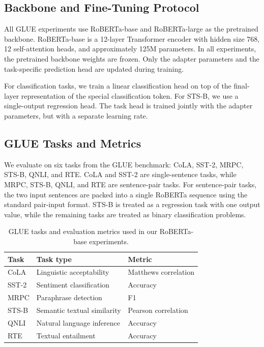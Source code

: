 \subsection{Backbone and Fine-Tuning Protocol}

All GLUE experiments use RoBERTa-base and RoBERTa-large as the pretrained backbone. RoBERTa-base is a 12-layer Transformer encoder with hidden size 768, 12 self-attention heads, and approximately 125M parameters. In all experiments, the pretrained backbone weights are frozen. Only the adapter parameters and the task-specific prediction head are updated during training.

For classification tasks, we train a linear classification head on top of the final-layer representation of the special classification token. For STS-B, we use a single-output regression head. The task head is trained jointly with the adapter parameters, but with a separate learning rate.

\subsection{GLUE Tasks and Metrics}

We evaluate on six tasks from the GLUE benchmark: CoLA, SST-2, MRPC, STS-B, QNLI, and RTE. CoLA and SST-2 are single-sentence tasks, while MRPC, STS-B, QNLI, and RTE are sentence-pair tasks. For sentence-pair tasks, the two input sentences are packed into a single RoBERTa sequence using the standard pair-input format. STS-B is treated as a regression task with one output value, while the remaining tasks are treated as binary classification problems.

\begin{table}[h]
\centering
\caption{GLUE tasks and evaluation metrics used in our RoBERTa-base experiments.}
\label{tab:glue_tasks_metrics}
\begin{tabular}{lll}
\toprule
Task & Task type & Metric \\
\midrule
CoLA  & Linguistic acceptability & Matthews correlation \\
SST-2 & Sentiment classification & Accuracy \\
MRPC  & Paraphrase detection & F1 \\
STS-B & Semantic textual similarity & Pearson correlation \\
QNLI  & Natural language inference & Accuracy \\
RTE   & Textual entailment & Accuracy \\
\bottomrule
\end{tabular}
\end{table}

